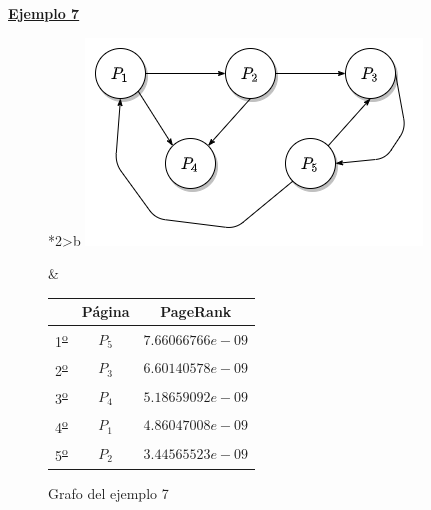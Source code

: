 \documentclass[size=a4, parskip=half, titlepage=false, toc=flat, toc=bib, 12pt, twoside]{scrartcl}
\theoremstyle{theorem-style}
\theoremstyle{definition-style}
\theoremstyle{remark-style}
\theoremstyle{example-style}
\theoremstyle{definition-style}
\theoremstyle{remark-style}
\begin{document}
\underline{\textbf{Ejemplo 7}}

\begin{figure}[!ht]
  \begin{tabular}{*{2}{>{\centering\arraybackslash}b{}}}
  \centering
    \includegraphics[scale=0.5]{./img/grafoej7}
    \caption{Grafo del ejemplo 7}
    \label{ejemplo7}
    &
      \renewcommand{\arraystretch}{1.3}
      \begin{tabular}{ccc}
        & Página & PageRank         \\ \hline
      1\textsuperscript{\underline{o}}} & $P_5$  & $7.66066766e-09$ \\ \hline
      2\textsuperscript{\underline{o}}} & $P_3$  & $6.60140578e-09$ \\ \hline
      3\textsuperscript{\underline{o}}} & $P_4$  & $5.18659092e-09$ \\ \hline
      4\textsuperscript{\underline{o}}} & $P_1$  & $4.86047008e-09$ \\ \hline
      5\textsuperscript{\underline{o}}} & $P_2$  & $3.44565523e-09$ \\ \hline
      \end{tabular}\label{tablaejemplo7}
    \end{tabular}
\end{figure}

\newpage
\end{document}
